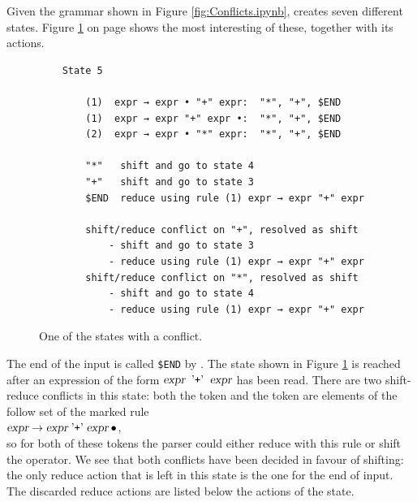 Given the grammar shown in Figure \ref{fig:Conflicts.ipynb},  creates seven different states.
Figure \ref{fig:Conflicts.ipynb:state5} on page \pageref{fig:Conflicts.ipynb:state5} shows the most interesting
of these, together with its actions.

\begin{figure}[!ht]
\centering
\begin{verbatim}
    State 5

        (1)  expr → expr • "+" expr:  "*", "+", $END
        (1)  expr → expr "+" expr •:  "*", "+", $END
        (2)  expr → expr • "*" expr:  "*", "+", $END

        "*"   shift and go to state 4
        "+"   shift and go to state 3
        $END  reduce using rule (1) expr → expr "+" expr

        shift/reduce conflict on "+", resolved as shift
            - shift and go to state 3
            - reduce using rule (1) expr → expr "+" expr
        shift/reduce conflict on "*", resolved as shift
            - shift and go to state 4
            - reduce using rule (1) expr → expr "+" expr
\end{verbatim}
\vspace*{-0.3cm}
\caption{One of the states with a conflict.}
\label{fig:Conflicts.ipynb:state5}
\end{figure}

\noindent
The end of the input is called \texttt{\$END} by .  The state shown in Figure
\ref{fig:Conflicts.ipynb:state5} is reached after an expression of the form
$\textsl{expr}\; \;\mbox{'\texttt{+}'}\; \;\textsl{expr}$ has been read.  There are two shift-reduce conflicts in this
state: both the token \aquoted{+} and the token \aquoted{*} are elements of the follow set of the marked rule
\\[0.2cm]
\hspace*{1.3cm}
$\textsl{expr} \rightarrow \textsl{expr} \aquoted{+} \textsl{expr} \mdot$,
\\[0.2cm]
so for both of these tokens the parser could either reduce with this rule or shift the operator.  We see that
both conflicts have been decided in favour of shifting: the only reduce action that is left in this state is
the one for the end of input.  The discarded reduce actions are listed below the actions of the state.

